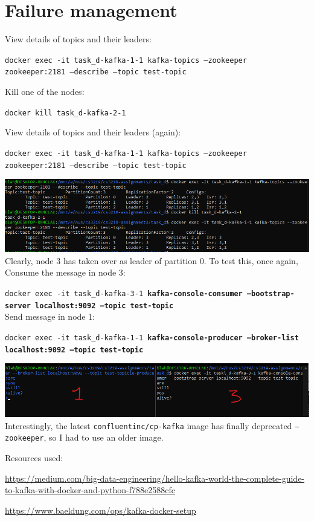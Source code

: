 \documentclass{article}
\begin{document}
    \pagebreak
    \section*{Failure management}

    View details of topics and their leaders:

    \texttt{docker exec -it task\_d-kafka-1-1 kafka-topics --zookeeper zookeeper:2181 --describe --topic test-topic}

    Kill one of the nodes:

    \texttt{docker kill task\_d-kafka-2-1}

    View details of topics and their leaders (again):

    \texttt{docker exec -it task\_d-kafka-1-1 kafka-topics --zookeeper zookeeper:2181 --describe --topic test-topic}

    \includegraphics[width=\textwidth]{img/ded.png}\\

    Clearly, node 3 has taken over as leader of partition 0. To test this, once again,\\

    Consume the message in node 3:

    \texttt{docker exec -it task\_d-kafka-3-1 \textbf{kafka-console-consumer --bootstrap-server localhost:9092 --topic test-topic}}\\


    Send message in node 1:

    \texttt{docker exec -it task\_d-kafka-1-1 \textbf{kafka-console-producer --broker-list localhost:9092 --topic test-topic}}

    \includegraphics[width=\textwidth]{img/stillAlive.png}\\


    Interestingly, the latest \texttt{confluentinc/cp-kafka} image has finally deprecated \texttt{--zookeeper}, so I had to use an older image.

    \vspace*{\fill}
    Resources used:

    \href{https://medium.com/big-data-engineering/hello-kafka-world-the-complete-guide-to-kafka-with-docker-and-python-f788e2588cfc}{https://medium.com/big-data-engineering/hello-kafka-world-the-complete-guide-to-kafka-with-docker-and-python-f788e2588cfc}

    \href{https://www.baeldung.com/ops/kafka-docker-setup}{https://www.baeldung.com/ops/kafka-docker-setup}
\end{document}
